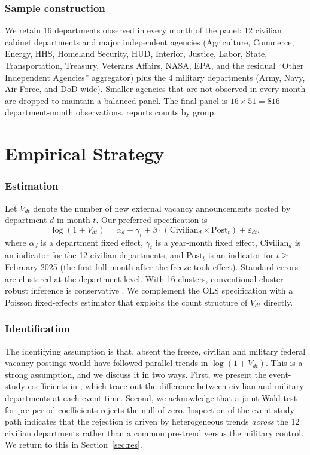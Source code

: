 \documentclass[12pt]{article}
\begin{document}
\subsubsection*{Sample construction} We retain 16 departments observed in every month of the panel: 12 civilian cabinet departments and major independent agencies (Agriculture, Commerce, Energy, HHS, Homeland Security, HUD, Interior, Justice, Labor, State, Transportation, Treasury, Veterans Affairs, NASA, EPA, and the residual ``Other Independent Agencies'' aggregator) plus the 4 military departments (Army, Navy, Air Force, and DoD-wide). Smaller agencies that are not observed in every month are dropped to maintain a balanced panel. The final panel is $16 \times 51 = 816$ department-month observations.  reports counts by group.



\section{Empirical Strategy}
\label{sec:emp}

\subsubsection*{Estimation} Let $V_{dt}$ denote the number of new external vacancy announcements posted by department $d$ in month $t$. Our preferred specification is
\begin{equation}
\log(1 + V_{dt}) = \alpha_d + \gamma_t + \beta \cdot (\text{Civilian}_d \times \text{Post}_t) + \varepsilon_{dt},
\end{equation}
where $\alpha_d$ is a department fixed effect, $\gamma_t$ is a year-month fixed effect, $\text{Civilian}_d$ is an indicator for the 12 civilian departments, and $\text{Post}_t$ is an indicator for $t \geq$ February 2025 (the first full month after the freeze took effect). Standard errors are clustered at the department level. With 16 clusters, conventional cluster-robust inference is conservative \citep{cameron2008bootstrap,mackinnon2017wild}. We complement the OLS specification with a Poisson fixed-effects estimator that exploits the count structure of $V_{dt}$ directly.

\subsubsection*{Identification} The identifying assumption is that, absent the freeze, civilian and military federal vacancy postings would have followed parallel trends in $\log(1+V_{dt})$. This is a strong assumption, and we discuss it in two ways. First, we present the event-study coefficients in , which trace out the difference between civilian and military departments at each event time. Second, we acknowledge that a joint Wald test for pre-period coefficients rejects the null of zero. Inspection of the event-study path indicates that the rejection is driven by heterogeneous trends \emph{across} the 12 civilian departments rather than a common pre-trend versus the military control. We return to this in Section~\ref{sec:res}.
\end{document}
